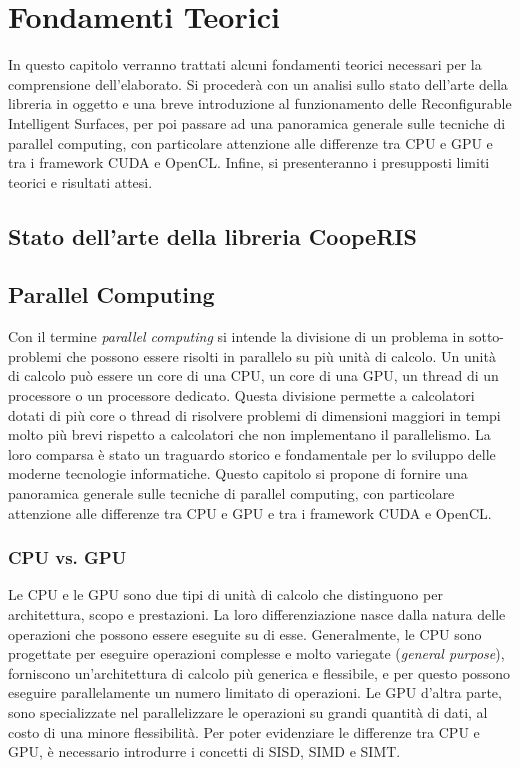 \chapter{Fondamenti Teorici}
\label{ch:fondamenti}

In questo capitolo verranno trattati alcuni fondamenti teorici necessari per la
comprensione dell'elaborato. Si procederà con un analisi sullo stato dell'arte della
libreria in oggetto e una breve introduzione al funzionamento delle Reconfigurable
Intelligent Surfaces, per poi passare ad una panoramica generale sulle tecniche
di parallel computing, con particolare attenzione alle differenze tra CPU e GPU e
tra i framework CUDA e OpenCL. Infine, si presenteranno i presupposti limiti teorici
e risultati attesi.

\section{Stato dell'arte della libreria CoopeRIS}
\label{sec:statodellarte}

\lipsum[1]

\section{Parallel Computing}
\label{sec:parallelcomputing}

Con il termine \textit{parallel computing} si intende la divisione di un problema
in sotto-problemi che possono essere risolti in parallelo su più unità di calcolo.
Un unità di calcolo può essere un core di una CPU, un core di una GPU, un thread
di un processore o un processore dedicato. Questa divisione permette a calcolatori
dotati di più core o thread di risolvere problemi di dimensioni maggiori in tempi
molto più brevi rispetto a calcolatori che non implementano il parallelismo. La
loro comparsa è stato un traguardo storico e fondamentale per lo sviluppo delle
moderne tecnologie informatiche. Questo capitolo si propone di fornire una panoramica
generale sulle tecniche di parallel computing, con particolare attenzione alle
differenze tra CPU e GPU e tra i framework CUDA e OpenCL.

\subsection{CPU vs. GPU}
\label{subsec:cpuvsgpu}

Le CPU e le GPU sono due tipi di unità di calcolo che distinguono per architettura,
scopo e prestazioni. La loro differenziazione nasce dalla natura delle operazioni
che possono essere eseguite su di esse. Generalmente, le CPU sono progettate per
eseguire operazioni complesse e molto variegate (\textit{general purpose}), forniscono
un'architettura di calcolo più generica e flessibile, e per questo possono
eseguire parallelamente un numero limitato di operazioni. Le GPU d'altra parte,
sono specializzate nel parallelizzare le operazioni su grandi quantità di dati, al
costo di una minore flessibilità. Per poter evidenziare le differenze tra CPU e
GPU, è necessario introdurre i concetti di SISD, SIMD e SIMT.

